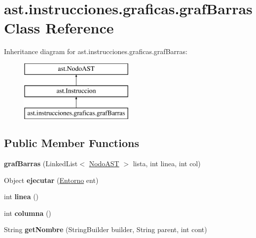\hypertarget{classast_1_1instrucciones_1_1graficas_1_1graf_barras}{}\section{ast.\+instrucciones.\+graficas.\+graf\+Barras Class Reference}
\label{classast_1_1instrucciones_1_1graficas_1_1graf_barras}
Inheritance diagram for ast.\+instrucciones.\+graficas.\+graf\+Barras\+:\begin{figure}[H]
\begin{center}
\leavevmode
\includegraphics[height=3.000000cm]{classast_1_1instrucciones_1_1graficas_1_1graf_barras}
\end{center}
\end{figure}
\subsection*{Public Member Functions}
\begin{DoxyCompactItemize}
\item 
\mbox{\label{classast_1_1instrucciones_1_1graficas_1_1graf_barras_a730997c92ff80c5e0ec73620b1d14a2b}} 
{\bfseries graf\+Barras} (Linked\+List$<$ \mbox{\hyperlink{interfaceast_1_1_nodo_a_s_t}{Nodo\+A\+ST}} $>$ lista, int linea, int col)
\item 
\mbox{\label{classast_1_1instrucciones_1_1graficas_1_1graf_barras_af9faa1a9539984ead67f4bbfe79e5c84}} 
Object {\bfseries ejecutar} (\mbox{\hyperlink{classentorno_1_1_entorno}{Entorno}} ent)
\item 
\mbox{\label{classast_1_1instrucciones_1_1graficas_1_1graf_barras_a174231deff52a178e12a49f3120b89d6}} 
int {\bfseries linea} ()
\item 
\mbox{\label{classast_1_1instrucciones_1_1graficas_1_1graf_barras_aad96a2b643fdd6f1fe83260b5a8e872b}} 
int {\bfseries columna} ()
\item 
\mbox{\label{classast_1_1instrucciones_1_1graficas_1_1graf_barras_a6c9af2a57ad2fb50dce2eae3365715e0}} 
String {\bfseries get\+Nombre} (String\+Builder builder, String parent, int cont)
\end{DoxyCompactItemize}



